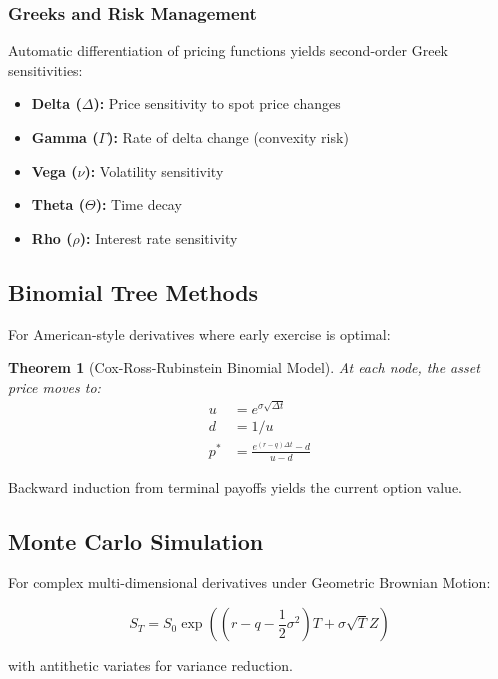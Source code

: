 \documentclass[12pt,a4paper]{article}
\newtheorem{theorem}{Theorem}
\begin{document}
\subsubsection{Greeks and Risk Management}

Automatic differentiation of pricing functions yields second-order Greek sensitivities:
\begin{itemize}
    \item \textbf{Delta ($\Delta$):} Price sensitivity to spot price changes
    \item \textbf{Gamma ($\Gamma$):} Rate of delta change (convexity risk)
    \item \textbf{Vega ($\nu$):} Volatility sensitivity
    \item \textbf{Theta ($\Theta$):} Time decay
    \item \textbf{Rho ($\rho$):} Interest rate sensitivity
\end{itemize}

\subsection{Binomial Tree Methods}

For American-style derivatives where early exercise is optimal:

\begin{theorem}[Cox-Ross-Rubinstein Binomial Model]
At each node, the asset price moves to:
\begin{align}
u &= e^{\sigma\sqrt{\Delta t}} \\
d &= 1/u \\
p^* &= \frac{e^{(r-q)\Delta t} - d}{u - d}
\end{align}
\end{theorem}

Backward induction from terminal payoffs yields the current option value.

\subsection{Monte Carlo Simulation}

For complex multi-dimensional derivatives under Geometric Brownian Motion:

\begin{equation}
S_T = S_0 \exp\left((r-q-\frac{1}{2}\sigma^2)T + \sigma\sqrt{T}Z\right)
\end{equation}

with antithetic variates for variance reduction.
\end{document}
